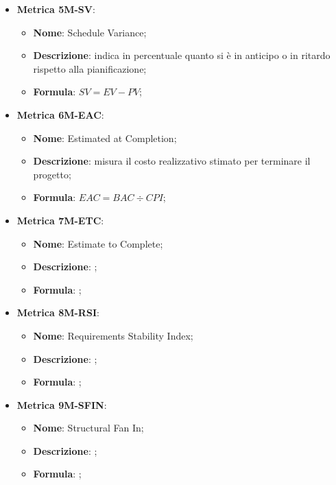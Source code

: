 \begin{itemize}
    \item \textbf{Metrica 5M-SV}:
    \begin{itemize}
        \item \textbf{Nome}: Schedule Variance;
        \item \textbf{Descrizione}: indica in percentuale quanto si è in anticipo o in ritardo rispetto alla pianificazione;
        \item \textbf{Formula}: $SV = EV - PV$;
    \end{itemize}
\end{itemize}

\begin{itemize}
    \item \textbf{Metrica 6M-EAC}:
    \begin{itemize}
        \item \textbf{Nome}: Estimated at Completion;
        \item \textbf{Descrizione}: misura il costo realizzativo stimato per terminare il progetto;
        \item \textbf{Formula}: $EAC = BAC \div CPI$;
    \end{itemize}
\end{itemize}

\begin{itemize}
    \item \textbf{Metrica 7M-ETC}:
    \begin{itemize}
        \item \textbf{Nome}: Estimate to Complete;
        \item \textbf{Descrizione}: ;
        \item \textbf{Formula}: ;
    \end{itemize}
\end{itemize}

\begin{itemize}
    \item \textbf{Metrica 8M-RSI}:
    \begin{itemize}
        \item \textbf{Nome}: Requirements Stability Index;
        \item \textbf{Descrizione}: ;
        \item \textbf{Formula}: ;
    \end{itemize}
\end{itemize}

\begin{itemize}
    \item \textbf{Metrica 9M-SFIN}:
    \begin{itemize}
        \item \textbf{Nome}: Structural Fan In;
        \item \textbf{Descrizione}: ;
        \item \textbf{Formula}: ;
    \end{itemize}
\end{itemize}

